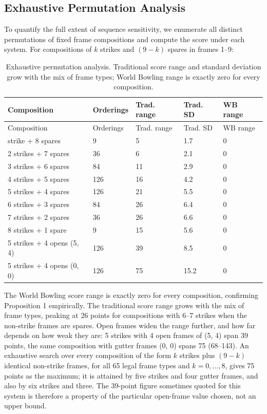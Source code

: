 \documentclass[
  letterpaper,
  DIV=11,
  numbers=noendperiod]{scrartcl}
\begin{document}
\subsection{Exhaustive Permutation
Analysis}\label{exhaustive-permutation-analysis}

To quantify the full extent of sequence sensitivity, we enumerate all
distinct permutations of fixed frame compositions and compute the score
under each system. For compositions of \(k\) strikes and \((9-k)\)
spares in frames 1--9:

\begin{longtable}[]{@{}lllll@{}}
\caption{Exhaustive permutation analysis. Traditional score range and
standard deviation grow with the mix of frame types; World Bowling range
is exactly zero for every
composition.}\label{tbl-permutations}\tabularnewline
\toprule\noalign{}
Composition & Orderings & Trad. range & Trad. SD & WB range \\
\midrule\noalign{}
\endfirsthead
\toprule\noalign{}
Composition & Orderings & Trad. range & Trad. SD & WB range \\
\midrule\noalign{}
\endhead
\bottomrule\noalign{}
\endlastfoot
1 strike + 8 spares & 9 & 5 & 1.7 & 0 \\
2 strikes + 7 spares & 36 & 6 & 2.1 & 0 \\
3 strikes + 6 spares & 84 & 11 & 2.9 & 0 \\
4 strikes + 5 spares & 126 & 16 & 4.2 & 0 \\
5 strikes + 4 spares & 126 & 21 & 5.5 & 0 \\
6 strikes + 3 spares & 84 & 26 & 6.4 & 0 \\
7 strikes + 2 spares & 36 & 26 & 6.6 & 0 \\
8 strikes + 1 spare & 9 & 15 & 5.6 & 0 \\
5 strikes + 4 opens (5, 4) & 126 & 39 & 8.5 & 0 \\
5 strikes + 4 opens (0, 0) & 126 & 75 & 15.2 & 0 \\
\end{longtable}

The World Bowling score range is exactly zero for every composition,
confirming Proposition 1 empirically. The traditional score range grows
with the mix of frame types, peaking at 26 points for compositions with
6--7 strikes when the non-strike frames are spares. Open frames widen
the range further, and how far depends on how weak they are: 5 strikes
with 4 open frames of (5, 4) span 39 points, the same composition with
gutter frames (0, 0) spans 75 (68--143). An exhaustive search over every
composition of the form \(k\) strikes plus \((9-k)\) identical
non-strike frames, for all 65 legal frame types and
\(k = 0, \ldots, 8\), gives 75 points as the maximum; it is attained by
five strikes and four gutter frames, and also by six strikes and three.
The 39-point figure sometimes quoted for this system is therefore a
property of the particular open-frame value chosen, not an upper bound.
\end{document}
